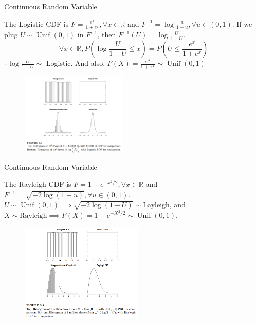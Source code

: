 \documentclass[8pt]{beamer}
\newcommand{\myunif}[2]{\operatorname{Unif}\!\left(#1, #2\right)}
\begin{document}
\begin{frame}{Continuous Random Variable}
    \begin{example}
        The Logistic CDF is $F = \frac{e^x}{1+e^x}, \forall x \in \mathbb{R}$ and $F^{-1} = \log{\frac{u}{1-u}}, \forall u \in (0,1)$. If we plug $U \sim \myunif{0}{1}$ in $F^{-1}$, then $F^{-1}(U) = \log{\frac{U}{1-U}}$.
        \[\forall x \in \mathbb{R},
        P\left(\log{\frac{U}{1-U}}\leq x\right) = P\left(U \leq \frac{e^x}{1+ e^x} \right)
        \]
        $\therefore \log{\frac{U}{1-U}} \sim$ Logistic. And also, $F(X) = \frac{e^X}{1+e^X} \sim \myunif{0}{1}$ 
    \end{example}
    \begin{figure}
        \centering
        \includegraphics[width=0.45\textwidth]{fig1.png}
    \end{figure}
\end{frame}

\begin{frame}{Continuous Random Variable}
    \begin{example}
        The Rayleigh CDF is $F = 1 - e^{- x^2/2}, \forall x \in \mathbb{R}$ and $F^{-1} = \sqrt{-2 \log{(1-u)}}, \forall u \in (0,1)$.
        $U \sim \myunif{0}{1} \implies \sqrt{-2 \log{(1-U)}} \sim $Layleigh, and $X \sim \text{Rayleigh} \implies F(X)=1-e^{-X^2/2} \sim \myunif{0}{1}$.
    \end{example}
    \begin{figure}
        \centering
        \includegraphics[width=0.52\textwidth]{fig2.png}
    \end{figure}
\end{frame}
\end{document}
